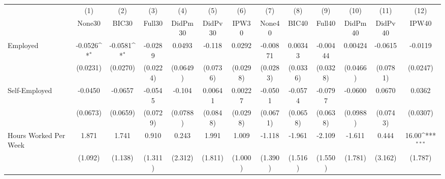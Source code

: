 {
\def\sym#1{\ifmmode^{#1}\else\(^{#1}\)\fi}
\begin{tabular}{l*{12}{c}}
\toprule
            &\multicolumn{1}{c}{(1)}&\multicolumn{1}{c}{(2)}&\multicolumn{1}{c}{(3)}&\multicolumn{1}{c}{(4)}&\multicolumn{1}{c}{(5)}&\multicolumn{1}{c}{(6)}&\multicolumn{1}{c}{(7)}&\multicolumn{1}{c}{(8)}&\multicolumn{1}{c}{(9)}&\multicolumn{1}{c}{(10)}&\multicolumn{1}{c}{(11)}&\multicolumn{1}{c}{(12)}\\
            &\multicolumn{1}{c}{None30}&\multicolumn{1}{c}{BIC30}&\multicolumn{1}{c}{Full30}&\multicolumn{1}{c}{DidPm30}&\multicolumn{1}{c}{DidPv30}&\multicolumn{1}{c}{IPW30}&\multicolumn{1}{c}{None40}&\multicolumn{1}{c}{BIC40}&\multicolumn{1}{c}{Full40}&\multicolumn{1}{c}{DidPm40}&\multicolumn{1}{c}{DidPv40}&\multicolumn{1}{c}{IPW40}\\
\midrule
Employed    &     -0.0526\sym{*}  &     -0.0581\sym{*}  &     -0.0289         &      0.0493         &      -0.118         &      0.0292         &    -0.00871         &     0.00343         &    -0.00444         &     0.00424         &     -0.0615         &     -0.0119         \\
            &    (0.0231)         &    (0.0270)         &    (0.0224)         &    (0.0649)         &    (0.0736)         &    (0.0298)         &    (0.0283)         &    (0.0336)         &    (0.0328)         &    (0.0466)         &    (0.0781)         &    (0.0247)         \\
\addlinespace
Self-Employed&     -0.0450         &     -0.0657         &     -0.0545         &      -0.104         &     0.00641         &     0.00227         &     -0.0501         &     -0.0574         &     -0.0797         &     -0.0600         &      0.0670         &      0.0362         \\
            &    (0.0673)         &    (0.0659)         &    (0.0729)         &    (0.0788)         &    (0.0848)         &    (0.0298)         &    (0.0671)         &    (0.0658)         &    (0.0638)         &    (0.0988)         &    (0.0743)         &    (0.0307)         \\
\addlinespace
Hours Worked Per Week&       1.871         &       1.741         &       0.910         &       0.243         &       1.991         &       1.009         &      -1.118         &      -1.961         &      -2.109         &      -1.611         &       0.444         &       16.00\sym{***}\\
            &     (1.092)         &     (1.138)         &     (1.311)         &     (2.312)         &     (1.811)         &     (1.000)         &     (1.390)         &     (1.516)         &     (1.550)         &     (1.781)         &     (3.162)         &     (1.787)         \\

\end{tabular}}
